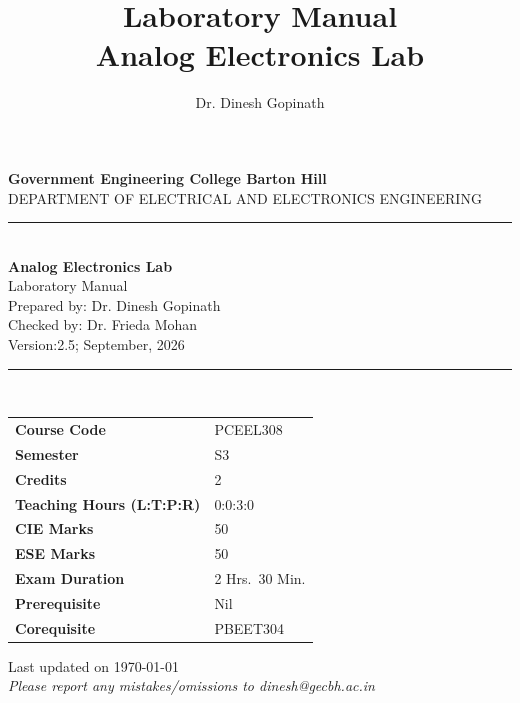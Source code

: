 \documentclass[11pt,a4paper]{report}
\title{\textbf{Laboratory Manual}\\[0.3cm]\Large Analog Electronics Lab}
\author{Dr. Dinesh Gopinath}
\date{}
\begin{document}
\begin{titlepage}
\centering
\vspace*{1cm}
{\Large \textbf{Government Engineering College Barton Hill}}\\[0.2cm]
{\large DEPARTMENT OF ELECTRICAL AND ELECTRONICS ENGINEERING}\\[1.5cm]
\rule{\linewidth}{0.5mm}\\[0.4cm]
{\Huge \bfseries Analog Electronics Lab}\\[0.3cm]
{\Large Laboratory Manual}\\[0.4cm]
{\large Prepared by: Dr. Dinesh Gopinath}\\[0.3 cm]
{\large Checked by: Dr. Frieda Mohan}\\[0.3 cm]
{Version:2.5; September, 2026}
\rule{\linewidth}{0.5mm}\\[1.5cm]
\begin{tabular}{ll}
\textbf{Course Code} & PCEEL308 \\
\textbf{Semester} & S3 \\
\textbf{Credits} & 2 \\
\textbf{Teaching Hours (L:T:P:R)} & 0:0:3:0 \\
\textbf{CIE Marks} & 50 \\
\textbf{ESE Marks} & 50 \\
\textbf{Exam Duration} & 2 Hrs.\ 30 Min. \\
\textbf{Prerequisite} & Nil \\
\textbf{Corequisite} & PBEET304\\
\end{tabular}

\vfill

\small{Last updated on {\today}}\\
\emph{Please report any mistakes/omissions to dinesh@gecbh.ac.in}

\vspace{1cm}
\end{titlepage}
\end{document}
